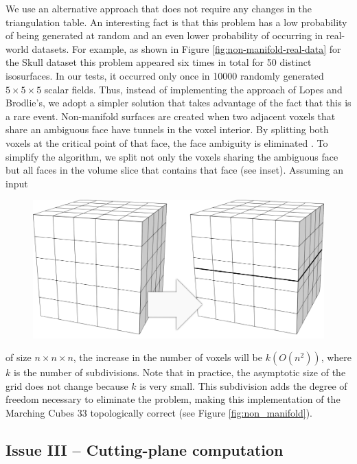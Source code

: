 We use an alternative approach that does not require any changes in the \mc{} triangulation table. An interesting fact is that this problem has a low probability of being generated at random and an even lower probability of occurring in real-world datasets. For example, as shown in Figure \ref{fig:non-manifold-real-data} for the Skull dataset this problem appeared six times in total for 50 distinct isosurfaces. In our tests, it occurred only once in 10000 randomly generated $5\times5\times5$ scalar fields. Thus, instead of implementing the approach of Lopes and Brodlie's, we adopt a simpler solution that takes advantage of the fact that this is a rare event.
%
Non-manifold surfaces are created when two adjacent voxels that share an ambiguous face have tunnels in the voxel interior. By splitting both voxels at the critical point of that face, the face ambiguity is  eliminated \cite{10.1109/TVCG.2009.10}.
To simplify the algorithm, we split not only the voxels sharing the ambiguous face but all faces in the volume slice that contains that face (see inset). Assuming an input
%
\begin{figure}
	\includegraphics[width=0.98\linewidth]{chapter4/figures/grid.png}
\end{figure}
%
of size $n \times n \times n$, the increase in the number of voxels will be $k(O(n^2))$, where $k$ is the number of subdivisions. Note that in practice, the asymptotic size of the grid does not change because $k$ is very small. This subdivision adds the degree of freedom necessary to eliminate the problem, making this implementation of the Marching Cubes 33 topologically correct (see Figure \ref{fig:non_manifold}). 


\subsection{Issue III -- Cutting-plane computation}

